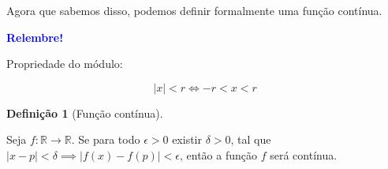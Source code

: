 \documentclass[12pt,openright,twoside,a4paper]{article}
\theoremstyle{definition}
\newtheorem{definition}{Definição}[section]
\begin{document}
	Agora que sabemos disso, podemos definir formalmente uma função contínua.
	\begin{snugshade}
		\textbf{\textcolor{blue}{Relembre!}}
		
		Propriedade do módulo:
		
		\begin{equation*}
			|x| < r \iff -r < x < r
		\end{equation*}
	\end{snugshade}
	
	\begin{definition}[Função contínua]\label{def:continuidade}
		
		Seja $f: \mathbb{R} \longrightarrow \mathbb{R}$. Se para todo $\epsilon > 0$ existir $\delta > 0$, tal que $| x - p |  < \delta \implies |f(x) - f(p) | < \epsilon$, então a função $f$ será contínua.
	\end{definition}
	
\end{document}

